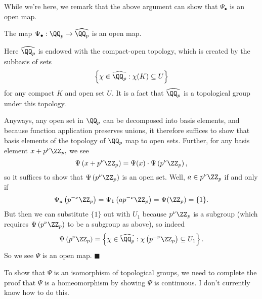 While we're here, we remark that the above argument can show that $\Psi_\bullet$ is an open map.
\begin{lemma}
    The map $\Psi_\bullet:\QQ_p\to\widehat{\QQ_p}$ is an open map.
\end{lemma}
Here $\widehat{\QQ_p}$ is endowed with the compact-open topology, which is created by the subbasis of sets
\[\left\{\chi\in\widehat{\QQ_p}:\chi(K)\subseteq U\right\}\]
for any compact $K$ and open set $U.$ It is a fact that $\widehat{\QQ_p}$ is a topological group under this topology.

Anyways, any open set in $\QQ_p$ can be decomposed into basis elements, and because function application preserves unions, it therefore suffices to show that basis elements of the topology of $\QQ_p$ map to open sets. Further, for any basis element $x+p^\nu\ZZ_p,$ we see
\[\Psi\left(x+p^\nu\ZZ_p\right)=\Psi(x)\cdot\Psi\left(p^\nu\ZZ_p\right),\]
so it suffices to show that $\Psi\left(p^\nu\ZZ_p\right)$ is an open set. Well, $a\in p^\nu\ZZ_p$ if and only if
\[\Psi_a\left(p^{-\nu}\ZZ_p\right)=\Psi_1\left(ap^{-\nu}\ZZ_p\right)=\Psi(\ZZ_p)=\{1\}.\]
But then we can substitute $\{1\}$ out with $U_1$ because $p^\nu\ZZ_p$ is a subgroup (which requires $\Psi\left(p^\nu\ZZ_p\right)$ to be a subgroup as above), so indeed
\[\Psi\left(p^\nu\ZZ_p\right)=\left\{\chi\in\widehat{\QQ_p}:\chi\left(p^{-\nu}\ZZ_p\right)\subseteq U_1\right\}.\]
So we see $\Psi$ is an open map. $\blacksquare$

To show that $\Psi$ is an isomorphism of topological groups, we need to complete the proof that $\Psi$ is a homeomorphism by showing $\Psi$ is continuous. I don't currently know how to do this.